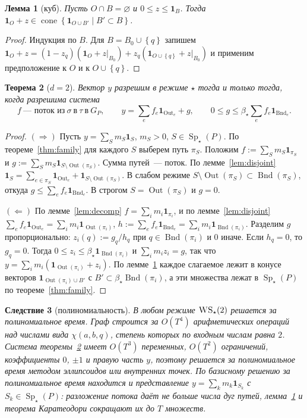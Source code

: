 \documentclass[a4paper,11pt]{article}
\theoremstyle{plain}
\newtheorem{theorem}{Теорема}[section]
\newtheorem{lemma}[theorem]{Лемма}
\newtheorem{corollary}[theorem]{Следствие}
\theoremstyle{definition}
\theoremstyle{remark}
\newcommand{\set}[1]{\left\{ #1 \right\}}
\DeclareMathOperator{\cone}{cone}
\DeclareMathOperator{\Sp}{Sp}
\DeclareMathOperator{\Out}{Out}
\DeclareMathOperator{\Bnd}{Bnd}
\newcommand{\WS}{\textsc{WS}}
\newcommand{\Spm}{\Sp_\star}
\begin{document}
\begin{lemma}[куб]\label{lem:cube}
    Пусть $O\cap B=\varnothing$ и $0\le z\le\mathbf 1_B$. Тогда $\mathbf 1_O+z\in\cone\set{\mathbf 1_{O\cup B'}\mid B'\subset B}$.
\end{lemma}

\begin{proof}
    Индукция по $B$. Для $B=B_0\cup\set q$ запишем $\mathbf 1_O+z=(1-z_q)(\mathbf 1_O+z|_{B_0})+z_q(\mathbf 1_{O\cup\set q}+z|_{B_0})$ и применим предположение к $O$ и к $O\cup\set q$.
\end{proof}

\begin{theorem}[$d=2$]\label{thm:lp}
    Вектор $y$ разрешим в режиме $\star$ тогда и только тогда, когда разрешима система
    \[
        f\ \text{--- поток из}\ \sigma\ \text{в}\ \tau\ \text{в}\ G_P,\qquad y=\sum_ef_e\mathbf 1_{\Out_e}+g,\qquad 0\le g\le\beta_\star\sum_ef_e\mathbf 1_{\Bnd_e}.
    \]
\end{theorem}

\begin{proof}
    $(\Rightarrow)$ Пусть $y=\sum_Sm_S\mathbf 1_S$, $m_S>0$, $S\in\Spm(P)$. По теореме~\ref{thm:family} для каждого $S$ выберем путь $\pi_S$. Положим $f:=\sum_Sm_S\mathbf 1_{\pi_S}$ и $g:=\sum_Sm_S\mathbf 1_{S\setminus\Out(\pi_S)}$. Сумма путей~--- поток. По лемме~\ref{lem:disjoint} $\mathbf 1_S=\sum_{e\in\pi_S}\mathbf 1_{\Out_e}+\mathbf 1_{S\setminus\Out(\pi_S)}$. В слабом режиме $S\setminus\Out(\pi_S)\subset\Bnd(\pi_S)$, откуда $g\le\sum_ef_e\mathbf 1_{\Bnd_e}$. В строгом $S=\Out(\pi_S)$ и $g=0$.

    $(\Leftarrow)$ По лемме~\ref{lem:decomp} $f=\sum_im_i\mathbf 1_{\pi_i}$, и по лемме~\ref{lem:disjoint} $\sum_ef_e\mathbf 1_{\Out_e}=\sum_im_i\mathbf 1_{\Out(\pi_i)}$, $h:=\sum_ef_e\mathbf 1_{\Bnd_e}=\sum_im_i\mathbf 1_{\Bnd(\pi_i)}$. Разделим $g$ пропорционально: $z_i(q):=g_q/h_q$ при $q\in\Bnd(\pi_i)$ и $0$ иначе. Если $h_q=0$, то $g_q=0$. Тогда $0\le z_i\le\beta_\star\mathbf 1_{\Bnd(\pi_i)}$ и $\sum_im_iz_i=g$, так что $y=\sum_im_i(\mathbf 1_{\Out(\pi_i)}+z_i)$. По лемме~\ref{lem:cube} каждое слагаемое лежит в конусе векторов $\mathbf 1_{\Out(\pi_i)\cup B'}$ с $B'\subset\beta_\star\Bnd(\pi_i)$, а эти множества лежат в $\Spm(P)$ по теореме~\ref{thm:family}.
\end{proof}

\begin{corollary}[полиномиальность]\label{cor:poly}
    В любом режиме $\WS_\star(2)$ решается за полиномиальное время. Граф строится за $O(T^4)$ арифметических операций над числами вида $\chi(a,b,q)$, степень которых по входным числам равна $2$. Система теоремы~\ref{thm:lp} имеет $O(T^3)$ переменных, $O(T^2)$ ограничений, коэффициенты $0$, $\pm1$ и правую часть $y$, поэтому решается за полиномиальное время методом эллипсоидов или внутренних точек. По базисному решению за полиномиальное время находится и представление $y=\sum_km_k\mathbf 1_{S_k}$ с $S_k\in\Spm(P)$: разложение потока даёт не больше числа дуг путей, лемма~\ref{lem:cube} и теорема Каратеодори сокращают их до $T$ множеств.
\end{corollary}
\end{document}
